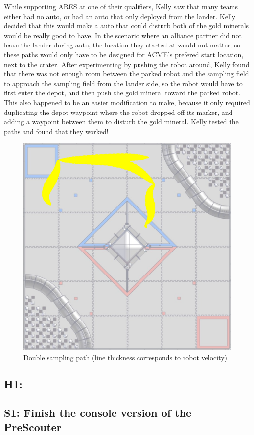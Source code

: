 \documentclass{article}
\begin{document}
While supporting ARES at one of their qualifiers, Kelly saw that many teams either had no auto, or had an auto that only deployed from the lander. Kelly decided that this would make a auto that could disturb both of the gold minerals would be really good to have. In the scenario where an alliance partner did not leave the lander during auto, the location they started at would not matter, so these paths would only have to be designed for ACME's prefered start location, next to the crater. After experimenting by pushing the robot around, Kelly found that there was not enough room between the parked robot and the sampling field to approach the sampling field from the lander side, so the robot would have to first enter the depot, and then push the gold mineral toward the parked robot. This also happened to be an easier modification to make, because it only required duplicating the depot waypoint where the robot dropped off its marker, and adding a waypoint between them to disturb the gold mineral. Kelly tested the paths and found that they worked!

\begin{figure}
    \centering
    \includegraphics[width=.6\textwidth]{22_01-28/double.png}
    \caption{Double sampling path (line thickness corresponds to robot velocity)}
    \label{fig:double}
\end{figure}
\newpage
\subsection{H1: }
 \subsection{S1: Finish the console version of the PreScouter}
\end{document}
